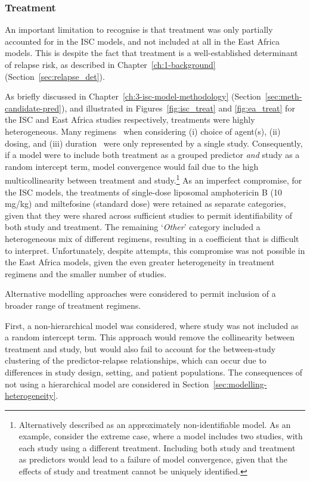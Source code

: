 \subsubsection{Treatment\label{sec:treat_limitations}}

An important limitation to recognise is that treatment was only partially accounted for in the ISC models, and not included at all in the East Africa models. This is despite the fact that treatment is a well-established determinant of relapse risk, as described in Chapter~\ref{ch:1-background} (Section~\ref{sec:relapse_det}).

As briefly discussed in Chapter~\ref{ch:3-isc-model-methodology} (Section~\ref{sec:meth-candidate-pred}), and illustrated in Figures~\ref{fig:isc_treat} and \ref{fig:ea_treat} for the ISC and East Africa studies respectively, treatments were highly heterogeneous. Many regimens \textemdash\ when considering (i) choice of agent(s), (ii) dosing, and (iii) duration \textemdash\ were only represented by a single study. Consequently, if a model were to include both treatment as a grouped predictor \textit{and} study as a random intercept term, model convergence would fail due to the high multicollinearity between treatment and study.\footnote{Alternatively described as an approximately non-identifiable model. As an example, consider the extreme case, where a model includes two studies, with each study using a different treatment. Including both study and treatment as predictors would lead to a failure of model convergence, given that the effects of study and treatment cannot be uniquely identified.} As an imperfect compromise, for the ISC models, the treatments of single-dose liposomal amphotericin B (10 mg/kg) and miltefosine (standard dose) were retained as separate categories, given that they were shared across sufficient studies to permit identifiability of both study and treatment. The remaining `\textit{Other}' category included a heterogeneous mix of different regimens, resulting in a coefficient that is difficult to interpret. Unfortunately, despite attempts, this compromise was not possible in the East Africa models, given the even greater heterogeneity in treatment regimens and the smaller number of studies.

Alternative modelling approaches were considered to permit inclusion of a broader range of treatment regimens.

First, a non-hierarchical model was considered, where study was not included as a random intercept term. This approach would remove the collinearity between treatment and study, but would also fail to account for the between-study clustering of the predictor-relapse relationships, which can occur due to differences in study design, setting, and patient populations. The consequences of not using a hierarchical model are considered in Section~\ref{sec:modelling-heterogeneity}.

